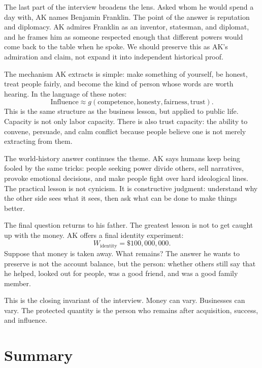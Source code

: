 The last part of the interview broadens the lens. Asked whom he would spend a day with, AK names Benjamin Franklin. The point of the answer is reputation and diplomacy. AK admires Franklin as an inventor, statesman, and diplomat, and he frames him as someone respected enough that different powers would come back to the table when he spoke. We should preserve this as AK's admiration and claim, not expand it into independent historical proof.

The mechanism AK extracts is simple: make something of yourself, be honest, treat people fairly, and become the kind of person whose words are worth hearing. In the language of these notes:
\begin{equation}
\mathrm{Influence}
\approx
g(\mathrm{competence},\mathrm{honesty},\mathrm{fairness},\mathrm{trust}).
\end{equation}
This is the same structure as the business lesson, but applied to public life. Capacity is not only labor capacity. There is also trust capacity: the ability to convene, persuade, and calm conflict because people believe one is not merely extracting from them.

The world-history answer continues the theme. AK says humans keep being fooled by the same tricks: people seeking power divide others, sell narratives, provoke emotional decisions, and make people fight over hard ideological lines. The practical lesson is not cynicism. It is constructive judgment: understand why the other side sees what it sees, then ask what can be done to make things better.

The final question returns to his father. The greatest lesson is not to get caught up with the money. AK offers a final identity experiment:
\begin{equation}
W_{\mathrm{identity}}=\$100{,}000{,}000.
\end{equation}
Suppose that money is taken away. What remains? The answer he wants to preserve is not the account balance, but the person: whether others still say that he helped, looked out for people, was a good friend, and was a good family member.

This is the closing invariant of the interview. Money can vary. Businesses can vary. The protected quantity is the person who remains after acquisition, success, and influence.

\section{Summary}

